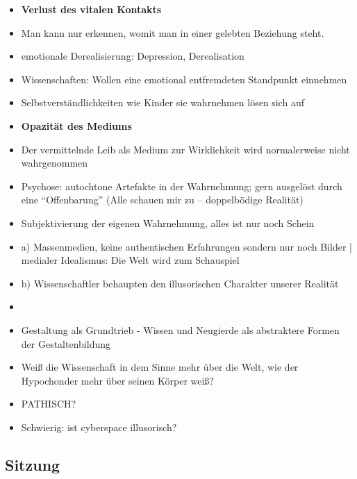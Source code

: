 \documentclass[emulatestandardclasses]{scrartcl}
\begin{document}
\begin{itemize}
  \item \textbf{Verlust des vitalen Kontakts}
  \item Man kann nur erkennen, womit man in einer gelebten Beziehung steht.
  \item emotionale Derealisierung: Depression, Derealisation
  \item Wissenschaften: Wollen eine emotional entfremdeten Standpunkt einnehmen
  \item Selbstverständlichkeiten wie Kinder sie wahrnehmen lösen sich auf
  \item \textbf{Opazität des Mediums}
  \item Der vermittelnde Leib als Medium zur Wirklichkeit wird normalerweise nicht wahrgenommen
  \item Psychose: autochtone Artefakte in der Wahrnehmung; gern ausgelöst durch eine "`Offenbarung"' (Alle schauen mir zu -- doppelbödige Realität)
  \item Subjektivierung der eigenen Wahrnehmung, alles ist nur noch Schein
  \item a) Massenmedien, keine authentischen Erfahrungen sondern nur noch Bilder | medialer Idealismus: Die Welt wird zum Schauspiel
  \item b) Wissenschaftler behaupten den illusorischen Charakter unserer Realität
  \item 
\end{itemize}


\begin{itemize}
  \item Gestaltung als Grundtrieb - Wissen und Neugierde als abstraktere Formen der Gestaltenbildung
  \item Weiß die Wissenschaft in dem Sinne mehr über die Welt, wie der Hypochonder mehr über seinen Körper weiß?
  \item PATHISCH?
  \item Schwierig: ist cyberspace illusorisch?
\end{itemize}

\subsection{Sitzung}
\end{document}
